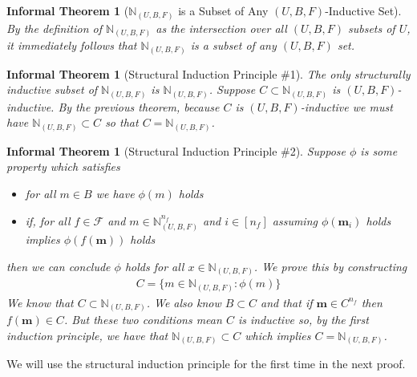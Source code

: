 \documentclass[12pt]{article}
\theoremstyle{break}
\theoremstyle{break}
\theoremstyle{break}
\theoremstyle{break}
\theoremstyle{break}
\newtheorem{informal definition}[definition]{Informal Definition}
\theoremstyle{break}
\newtheorem{informal theorem}[theorem]{Informal Theorem}
\newcommand{\bv}[1]{\boldsymbol{#1}}
\newcommand{\natnum}[0]{\mathbb{N}}
\begin{document}
	\begin{informal theorem}[$\natnum_{(U, B, F)}$ is a Subset of Any $(U, B, F)$-Inductive Set]
		By the definition of $\natnum_{(U, B, F)}$ as the intersection over all $(U, B, F)$ subsets of $U$, it immediately follows that $\natnum_{(U, B, F)}$ is a subset of any $(U, B, F)$ set.
	\end{informal theorem}
	
	\begin{informal theorem}[Structural Induction Principle \#1]
		The only structurally inductive subset of $\natnum_{(U, B, F)}$ is $\natnum_{(U, B, F)}$. 
		Suppose $C \subset \natnum_{(U, B, F)}$ is $(U, B, F)$-inductive. 
		By the previous theorem, because $C$ is $(U, B, F)$-inductive we must have $\natnum_{(U, B, F)} \subset C$ so that $C = \natnum_{(U, B, F)}$. 
	\end{informal theorem}
	
	\begin{informal theorem}[Structural Induction Principle \#2]
		Suppose $\phi$ is some property which satisfies
		
		\begin{itemize}
			\item{for all $m\in B$ we have $\phi(m)$ holds}
			\item{if, for all $f\in \mathcal{F}$ and $m\in \natnum_{(U, B, F)}^{n_f}$ and $i\in [n_f]$ assuming $\phi(\bv{m}_i)$ holds implies $\phi(f(\bv{m}))$ holds}
		\end{itemize}
		
		then we can conclude $\phi$ holds for all $x\in \natnum_{(U, B, F)}$.
		We prove this by constructing
		\begin{align*}
			C = \{m\in \natnum_{(U, B, F)}: \phi(m)\}
		\end{align*}
		We know that $C\subset \natnum_{(U, B, F)}$.
		We also know $B\subset C$ and that if $\bv{m}\in C^{n_f}$ then $f(\bv{m})\in C$.
		But these two conditions mean $C$ is inductive so, by the first induction principle, we have that $\natnum_{(U, B, F)} \subset C$ which implies $C = \natnum_{(U, B, F)}$.
	\end{informal theorem}
	
	We will use the structural induction principle for the first time in the next proof.
	
\end{document}
